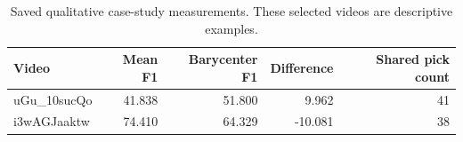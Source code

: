 \begin{table}[ht]
\centering
\caption{Saved qualitative case-study measurements. These selected videos are descriptive examples.}
\label{tab:mechanism-cases}
\begin{tabular}{lrrrr}
\toprule
Video & Mean F1 & Barycenter F1 & Difference & Shared pick count \\
\midrule
uGu\_10sucQo & 41.838 & 51.800 & 9.962 & 41 \\
i3wAGJaaktw & 74.410 & 64.329 & -10.081 & 38 \\
\bottomrule
\end{tabular}
\end{table}
